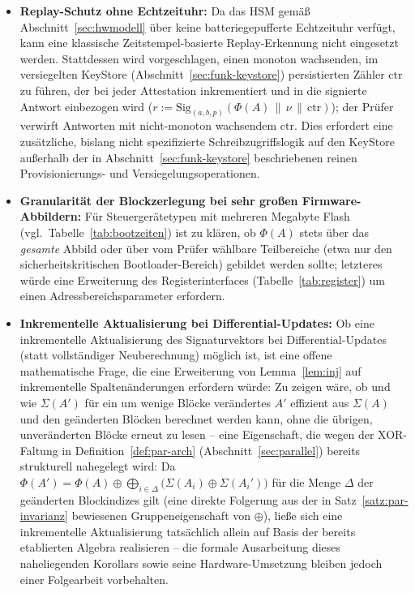 ﻿\documentclass[a4paper,12pt]{article}
\theoremstyle{definition}
\begin{document}
\begin{itemize}
	\item \textbf{Replay-Schutz ohne Echtzeituhr:} Da das HSM gemäß Abschnitt~\ref{sec:hwmodell} über keine batteriegepufferte Echtzeituhr verfügt, kann eine klassische Zeitstempel-basierte Replay-Erkennung nicht eingesetzt werden. Stattdessen wird vorgeschlagen, einen monoton wachsenden, im versiegelten KeyStore (Abschnitt~\ref{sec:funk-keystore}) persistierten Zähler $\mathrm{ctr}$ zu führen, der bei jeder Attestation inkrementiert und in die signierte Antwort einbezogen wird ($r := \mathrm{Sig}_{(a,b,p)}(\Phi(A) \,\|\, \nu \,\|\, \mathrm{ctr})$); der Prüfer verwirft Antworten mit nicht-monoton wachsendem $\mathrm{ctr}$. Dies erfordert eine zusätzliche, bislang nicht spezifizierte Schreibzugriffslogik auf den KeyStore außerhalb der in Abschnitt~\ref{sec:funk-keystore} beschriebenen reinen Provisionierungs- und Versiegelungsoperationen.
	\item \textbf{Granularität der Blockzerlegung bei sehr großen Firmware-Abbildern:} Für Steuergerätetypen mit mehreren Megabyte Flash (vgl.\ Tabelle~\ref{tab:bootzeiten}) ist zu klären, ob $\Phi(A)$ stets über das \emph{gesamte} Abbild oder über vom Prüfer wählbare Teilbereiche (etwa nur den sicherheitskritischen Bootloader-Bereich) gebildet werden sollte; letzteres würde eine Erweiterung des Registerinterfaces (Tabelle~\ref{tab:register}) um einen Adressbereichsparameter erfordern.
	\item \textbf{Inkrementelle Aktualisierung bei Differential-Updates:} Ob eine inkrementelle Aktualisierung des Signaturvektors bei Differential-Updates (statt vollständiger Neuberechnung) möglich ist, ist eine offene mathematische Frage, die eine Erweiterung von Lemma~\ref{lem:inj} auf inkrementelle Spaltenänderungen erfordern würde: Zu zeigen wäre, ob und wie $\Sigma(A')$ für ein um wenige Blöcke verändertes $A'$ effizient aus $\Sigma(A)$ und den geänderten Blöcken berechnet werden kann, ohne die übrigen, unveränderten Blöcke erneut zu lesen -- eine Eigenschaft, die wegen der XOR-Faltung in Definition~\ref{def:par-arch} (Abschnitt~\ref{sec:parallel}) bereits strukturell nahegelegt wird: Da $\Phi(A') = \Phi(A) \oplus \bigoplus_{i \in \Delta} \bigl(\Sigma(A_i) \oplus \Sigma(A_i')\bigr)$ für die Menge $\Delta$ der geänderten Blockindizes gilt (eine direkte Folgerung aus der in Satz~\ref{satz:par-invarianz} bewiesenen Gruppeneigenschaft von $\oplus$), ließe sich eine inkrementelle Aktualisierung tatsächlich allein auf Basis der bereits etablierten Algebra realisieren -- die formale Ausarbeitung dieses naheliegenden Korollars sowie seine Hardware-Umsetzung bleiben jedoch einer Folgearbeit vorbehalten.
\end{itemize}
\end{document}
